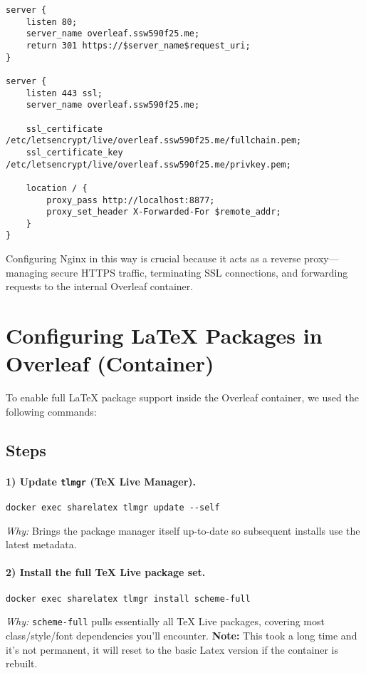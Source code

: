 \begin{verbatim}
server {
    listen 80;
    server_name overleaf.ssw590f25.me;
    return 301 https://$server_name$request_uri;
}

server {
    listen 443 ssl;
    server_name overleaf.ssw590f25.me;

    ssl_certificate /etc/letsencrypt/live/overleaf.ssw590f25.me/fullchain.pem;
    ssl_certificate_key /etc/letsencrypt/live/overleaf.ssw590f25.me/privkey.pem;

    location / {
        proxy_pass http://localhost:8877;
        proxy_set_header X-Forwarded-For $remote_addr;
    }
}
\end{verbatim}

Configuring Nginx in this way is crucial because it acts as a reverse proxy—managing secure HTTPS traffic, terminating SSL connections, and forwarding requests to the internal Overleaf container. 

\section{Configuring LaTeX Packages in Overleaf (Container)}

To enable full LaTeX package support inside the Overleaf container, we used the following commands:

\subsection*{Steps}

\paragraph{1) Update \texttt{tlmgr} (TeX Live Manager).}
\begin{verbatim}
docker exec sharelatex tlmgr update --self
\end{verbatim}
\emph{Why:} Brings the package manager itself up-to-date so subsequent installs use the latest metadata.

\paragraph{2) Install the full TeX Live package set.}
\begin{verbatim}
docker exec sharelatex tlmgr install scheme-full
\end{verbatim}
\emph{Why:} \texttt{scheme-full} pulls essentially all TeX Live packages, covering most class/style/font dependencies you’ll encounter.
\textbf{Note:} This took a long time and it's not permanent, it will reset to the basic Latex version if the container is rebuilt.

